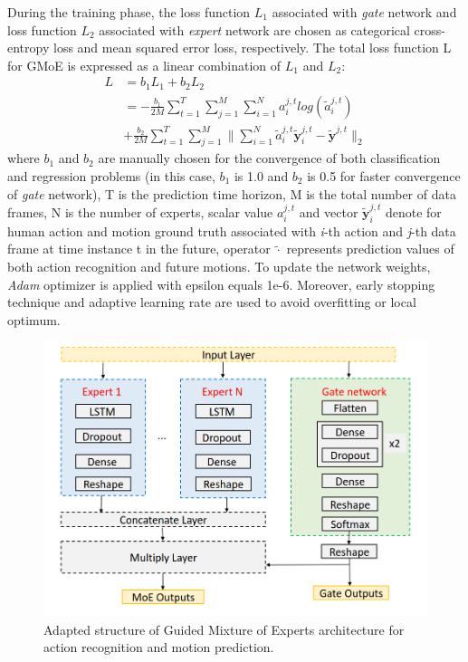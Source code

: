 During the training phase, the loss function $L_1$ associated with \emph{gate} network and loss function $L_2$ associated with \emph{expert} network are chosen as categorical cross-entropy loss and mean squared error loss, respectively. The total loss function L for GMoE is expressed as a linear combination of $L_1$ and $L_2$:
\begin{equation} \label{loss}
\begin{split}
L & = b_1L_1 + b_2L_2 \\
 & = -\frac{b_1}{2M}\sum_{t=1}^{T}\sum_{j=1}^{M}\sum_{i=1}^{N} a_i^{j,t}log(\tilde{a}_i^{j,t}) \\
 & + \frac{b_2}{2M}\sum_{t=1}^{T}\sum_{j=1}^{M}\|\sum_{i=1}^{N}\tilde{a}_i^{j,t}\tilde{\bm{y}}_i^{j,t}-\tilde{\bm{y}}^{j,t}\|_2
\end{split}
\end{equation}
where $b_1$ and $b_2$ are manually chosen for the convergence of both classification and regression problems (in this case, $b_1$ is 1.0 and $b_2$ is 0.5 for faster convergence of \emph{gate} network), T is the prediction time horizon, M is the total number of data frames, N is the number of experts, scalar value $a_i^{j,t}$ and vector $\tilde{\bm{y}}_i^{j,t}$ denote for human action and motion ground truth associated with \emph{i}-th action and \emph{j}-th data frame at time instance t in the future, operator $\tilde{\cdot}$ represents prediction values of both action recognition and future motions. To update the network weights, \emph{Adam} optimizer is applied with epsilon equals 1e-6. Moreover, early stopping technique and adaptive learning rate are used to avoid overfitting or local optimum. 

\begin{figure}[t]
    \centering
    \includegraphics[scale=0.24]{figures/fig_gmoe.png}
    \caption{Adapted structure of Guided Mixture of Experts architecture for action recognition and motion prediction.}
    \label{fig:moe_model}
\end{figure}

